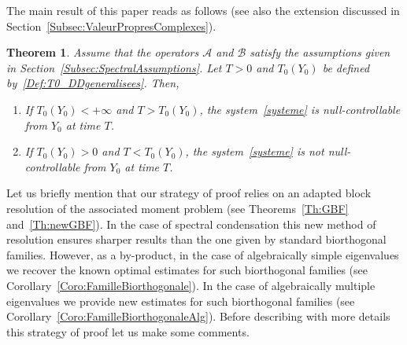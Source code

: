 \documentclass[11pt]{article}
\newtheorem{theo}{Theorem}[section]
\theoremstyle{definition}
\numberwithin{equation}{section}
\numberwithin{figure}{section}
\numberwithin{table}{section}
\newcommand\A{\mathcal{A}}
\newcommand\B{\mathcal{B}}
\newcommand{\Fzp}{Y_0}
\newcommand*{\romanenumi}{\renewcommand*{\theenumi}{\roman{enumi}}}
\begin{document}
The main result of this paper reads as follows (see also the extension discussed in Section~\ref{Subsec:ValeurPropresComplexes}).
\begin{theo} \label{Thm:Main}
Assume that the operators $\A$ and $\B$ satisfy the assumptions given in Section~\ref{Subsec:SpectralAssumptions}. Let $T>0$ and $T_0(\Fzp)$ be defined by~\eqref{Def:T0_DDgeneralisees}. Then,
\begin{enumerate}\romanenumi
\item \label{Thm:Main_pt1}
If $T_0(\Fzp) <+\infty$ and $T>T_0(\Fzp)$, the system~\eqref{systeme} is null-controllable from $\Fzp$ at time $T$.
\item \label{Thm:Main_pt2}
If $T_0(\Fzp) >0$ and $T<T_0(\Fzp)$, the system~\eqref{systeme} is not null-controllable from $\Fzp$ at time $T$.
\end{enumerate}
\end{theo}
Let us briefly mention that our strategy of proof relies on an adapted block resolution of the associated moment problem (see Theorems~\ref{Th:GBF} and~\ref{Th:newGBF}). In the case of spectral condensation this new method of resolution ensures sharper results than the one given by standard biorthogonal families. However, as a by-product, in the case of algebraically simple eigenvalues we recover the known optimal estimates for such biorthogonal families (see Corollary~\ref{Coro:FamilleBiorthogonale}). In the case of algebraically multiple eigenvalues we provide new estimates for such biorthogonal families (see Corollary~\ref{Coro:FamilleBiorthogonaleAlg}). Before describing with more details this strategy of proof let us make some comments.
\end{document}
